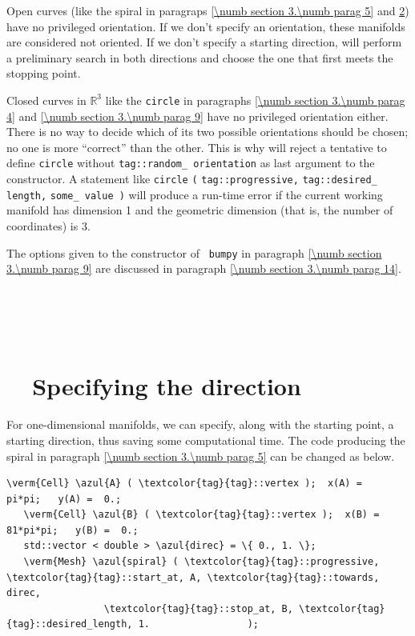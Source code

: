 Open curves (like the spiral in paragraps \ref{\numb section 3.\numb parag 5} and
\ref{\numb section 3.\numb parag 12}) have no privileged orientation.
If we don't specify an orientation, these manifolds are considered not oriented.
If we don't specify a starting direction, {\maniFEM} will perform a preliminary search
in both directions and choose the one that first meets the stopping point.

Closed curves in $ \mathbb{R}^3 $ like the {\small\tt circle} in paragraphs
\ref{\numb section 3.\numb parag 4} and \ref{\numb section 3.\numb parag 9}
have no privileged orientation either.
There is no way to decide which of its two possible orientations
should be chosen; no one is more ``correct'' than the other.
This is why {\maniFEM} will reject a tentative to define {\small\tt circle} without
{\small\tt \textcolor{tag}{tag}::random\_\,orientation} as last argument to the {\small\tt {}} constructor.
A statement like {\small\tt {}} {\small\tt circle} {\small\tt (}
{\small\tt \textcolor{tag}{tag}::progressive,} {\small\tt\textcolor{tag}{tag}::desired\_\,length,}
{\small\tt some\_\,value )}
will produce a run-time error if the current working manifold has dimension 1 and
the geometric dimension (that is, the number of coordinates) is 3.

The options given to the constructor of {\small\tt {} bumpy} in paragraph
\ref{\numb section 3.\numb parag 9} are discussed in paragraph
\ref{\numb section 3.\numb parag 14}.


\section{~~\cinza{[empty]}}\label{\numb section 3.\numb parag 11}


\section{~~Specifying the direction}\label{\numb section 3.\numb parag 12}

For one-dimensional manifolds, we can specify, along with the starting point,
a starting direction, thus saving some computational time.
The code producing the spiral in paragraph \ref{\numb section 3.\numb parag 5}
can be changed as below.

\begin{Verbatim}[commandchars=\\\{\},formatcom=\small\tt,
   baselinestretch=0.94,framesep=2mm                     ]
   \verm{Cell} \azul{A} ( \textcolor{tag}{tag}::vertex );  x(A) =    pi*pi;   y(A) =  0.;
   \verm{Cell} \azul{B} ( \textcolor{tag}{tag}::vertex );  x(B) = 81*pi*pi;   y(B) =  0.;
   std::vector < double > \azul{direc} = \{ 0., 1. \};
   \verm{Mesh} \azul{spiral} ( \textcolor{tag}{tag}::progressive, \textcolor{tag}{tag}::start_at, A, \textcolor{tag}{tag}::towards, direc,
                 \textcolor{tag}{tag}::stop_at, B, \textcolor{tag}{tag}::desired_length, 1.                 );
\end{Verbatim}

